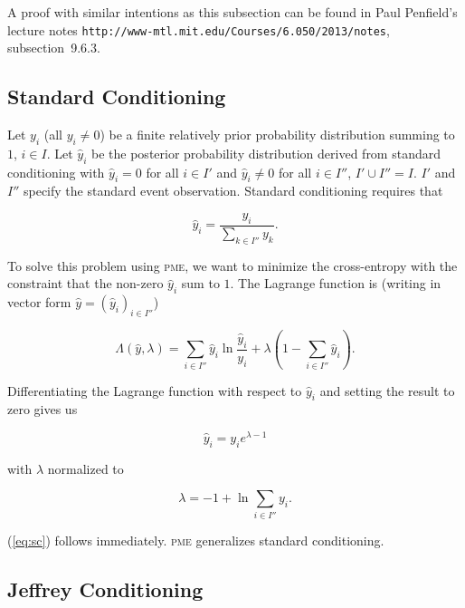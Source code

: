 \documentclass[phd,12pt,oneside]{ubcthesis}
\begin{document}
A proof with similar intentions as this subsection can be found in
Paul Penfield's lecture notes
\texttt{http://www-mtl.mit.edu/Courses/6.050/2013/notes},
subsection~9.6.3.

\subsection{Standard Conditioning}
\label{subsec:yeequika}

Let $y_{i}$ (all $y_{i}\neq{}0$) be a finite relatively prior
probability distribution summing to $1$, $i\in{}I$. Let $\hat{y}_{i}$
be the posterior probability distribution derived from standard
conditioning with $\hat{y}_{i}=0$ for all $i\in{}I'$ and
$\hat{y}_{i}\neq{}0$ for all $i\in{}I''$, $I'\cup{}I''=I$. $I'$ and
$I''$ specify the standard event observation. Standard conditioning
requires that

\begin{equation}
  \label{eq:sc}
  \hat{y}_{i}=\frac{y_{i}}{\sum_{k\in{}I''}y_{k}}.
\end{equation}

{\noindent}To solve this problem using \textsc{pme}, we want to minimize the
cross-entropy with the constraint that the non-zero $\hat{y}_{i}$ sum to
$1$. The Lagrange function is (writing in vector form
$\hat{y}=(\hat{y}_{i})_{i\in{}I''}$)

\begin{equation}
  \label{eq:sclag}
  \Lambda(\hat{y},\lambda)=\sum_{i\in{}I''}\hat{y}_{i}\ln\frac{\hat{y}_{i}}{y_{i}}+\lambda\left(1-\sum_{i\in{}I''}\hat{y}_{i}\right).
\end{equation}

{\noindent}Differentiating the Lagrange function with respect to $\hat{y}_{i}$ and
setting the result to zero gives us

\begin{equation}
  \label{eq:sc1}
  \hat{y}_{i}=y_{i}e^{\lambda-1}
\end{equation}

{\noindent}with $\lambda$ normalized to

\begin{equation}
  \label{eq:sc2}
  \lambda=-1+\ln{}\sum_{i\in{}I''}y_{i}.
\end{equation}

{\noindent}(\ref{eq:sc}) follows immediately. \textsc{pme} generalizes standard conditioning.

\subsection{Jeffrey Conditioning}
\label{subsec:ukotooje}
\end{document}
